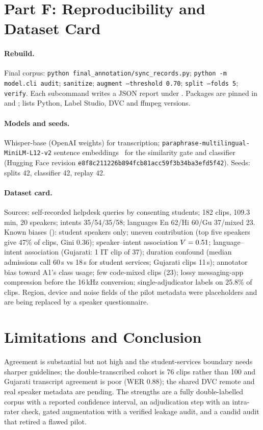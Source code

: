 \documentclass[sigconf,authordraft]{acmart}
\begin{document}
\section{Part F: Reproducibility and Dataset Card}\label{sec:repro}
\paragraph{Rebuild.}
Final corpus: \texttt{python final\_annotation/sync\_records.py}; \texttt{python -m model.cli audit}; \texttt{sanitize}; \texttt{augment --threshold 0.70}; \texttt{split --folds 5}; \texttt{verify}. Each subcommand writes a JSON report under . Packages are pinned in  and ;  lists Python, Label Studio, DVC and ffmpeg versions.
\paragraph{Models and seeds.}
Whisper-base (OpenAI weights) for transcription; \texttt{paraphrase-multilingual-MiniLM-L12-v2} sentence embeddings~\cite{Reimers2019} for the similarity gate and classifier (Hugging Face revision \texttt{e8f8c211226b894fcb81acc59f3b34ba3efd5f42}). Seeds: splits 42, classifier 42, replay 42.
\paragraph{Dataset card.}
Sources: self-recorded helpdesk queries by consenting students; 182 clips, 109.3\,min, 20 speakers; intents 35/54/35/58; languages En 62/Hi 60/Gu 37/mixed 23. Known biases (): student speakers only; uneven contribution (top five speakers give 47\% of clips, Gini 0.36); speaker--intent association $V=0.51{}$; language--intent association (Gujarati: 1 IT clip of 37); duration confound (median admissions call 60\,s vs 18\,s for student services; Gujarati clips 11\,s); annotator bias toward A1's class usage; few code-mixed clips (23); lossy messaging-app compression before the 16\,kHz conversion; single-adjudicator labels on 25.8\% of clips. Region, device and noise fields of the pilot metadata were placeholders and are being replaced by a speaker questionnaire.

\section{Limitations and Conclusion}\label{sec:concl}
Agreement is substantial but not high and the student-services boundary needs sharper guidelines; the double-transcribed cohort is 76 clips rather than 100 and Gujarati transcript agreement is poor (WER 0.88); the shared DVC remote and real speaker metadata are pending.
The strengths are a fully double-labelled corpus with a reported confidence interval, an adjudication step with an intra-rater check, gated augmentation with a verified leakage audit, and a candid audit that retired a flawed pilot.
\end{document}
